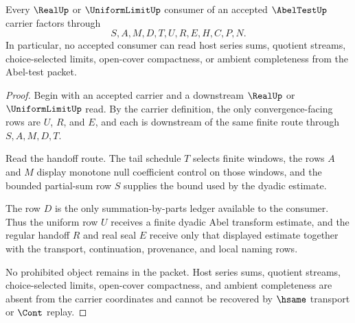 \begin{theorem}
\label{thm:abel-test-uniform-limit-handoff}
Every $\RealUp$ or $\UniformLimitUp$ consumer of an accepted $\AbelTestUp$ carrier factors through
$$
S,A,M,D,T,U,R,E,H,C,P,N.
$$
In particular, no accepted consumer can read host series sums, quotient streams, choice-selected limits, open-cover compactness, or ambient completeness from the Abel-test packet.
\end{theorem}
\begin{proof}
Begin with an accepted carrier and a downstream $\RealUp$ or $\UniformLimitUp$ read. By the carrier definition, the only convergence-facing rows are $U$, $R$, and $E$, and each is downstream of the same finite route through $S,A,M,D,T$.

Read the handoff route. The tail schedule $T$ selects finite windows, the rows $A$ and $M$ display monotone null coefficient control on those windows, and the bounded partial-sum row $S$ supplies the bound used by the dyadic estimate.

The row $D$ is the only summation-by-parts ledger available to the consumer. Thus the uniform row $U$ receives a finite dyadic Abel transform estimate, and the regular handoff $R$ and real seal $E$ receive only that displayed estimate together with the transport, continuation, provenance, and local naming rows.

No prohibited object remains in the packet. Host series sums, quotient streams, choice-selected limits, open-cover compactness, and ambient completeness are absent from the carrier coordinates and cannot be recovered by $\hsame$ transport or $\Cont$ replay.
\end{proof}



